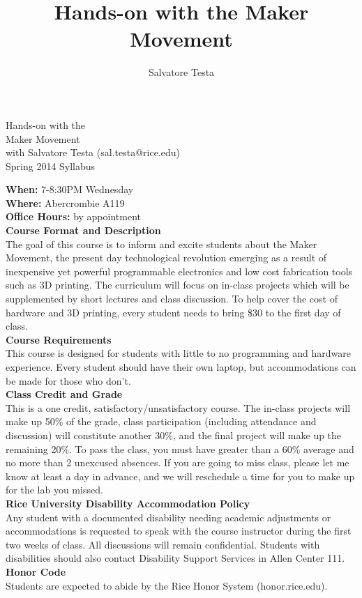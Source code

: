 \documentclass[12pt,letterpaper]{report}
\author{Salvatore Testa}
\title{Hands-on with the Maker Movement}
\begin{document}
\begin{center}
  {\Huge \sc Hands-on with the \\Maker Movement}\\
  {with Salvatore Testa (sal.testa@rice.edu)}\\
  {\small Spring 2014 Syllabus}
\end{center}
\textbf{When: } 7-8:30PM Wednesday\\
\textbf{Where: }Abercrombie A119\\
\textbf{Office Hours:} by appointment\\
\textbf{Course Format and Description}\\
The goal of this course is to inform and excite students about the Maker Movement, the present day technological revolution emerging as a result of inexpensive yet powerful programmable electronics and low cost fabrication tools such as 3D printing. The curriculum will focus on in-class projects which will be supplemented by short lectures and class discussion. To help cover the cost of hardware and 3D printing, every student needs to bring \$30 to the first day of class.\\
\textbf{Course Requirements}\\ 
This course is designed for students with little to no programming and hardware experience. Every student should have their own laptop, but accommodations can be made for those who don't.\\
\textbf{Class Credit and Grade}\\
This is a one credit, satisfactory/unsatisfactory course. The in-class projects will make up 50\% of the grade, class participation (including attendance and discussion) will constitute another 30\%, and the final project will make up the remaining 20\%. To pass the class, you must have greater than a 60\% average and no more than 2 unexcused absences. If you are going to miss class, please let me know at least a day in advance, and we will reschedule a time for you to make up for the lab you missed.\\
\textbf{Rice University Disability Accommodation Policy}\\
Any student with a documented disability needing academic adjustments or accommodations is requested to speak with the course instructor during the first two weeks of class. All discussions will remain confidential. Students with disabilities should also contact Disability Support Services in Allen Center 111.\\
\textbf{Honor Code}\\ 
Students are expected to abide by the Rice Honor System (honor.rice.edu).
\end{document}
